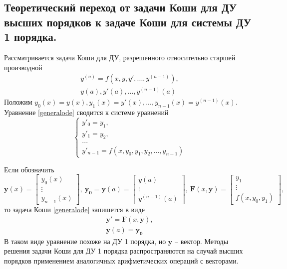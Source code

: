 \documentclass[a4paper, 12pt]{article}
\begin{document}
	\subsection{Теоретический переход от задачи Коши для ДУ высших порядков к задаче Коши для системы ДУ 1 порядка.}
	
	Рассматривается задача Коши для ДУ, разрешенного относительно старшей производной
	\begin{equation} \label{generalode}
		\begin{gathered}
			y^{(n)} = f(x,y,y',...,y^{(n-1)}),\\
			y(a), y'(a),...,y^{(n-1)}(a)
		\end{gathered}
	\end{equation}
	Положим $y_0(x) = y(x), y_1(x)=y'(x),...,y_{n-1}(x)=y^{(n-1)}(x)$. Уравнение \eqref{generalode} сводится к системе уравнений
	\begin{equation}
		\begin{cases}
			y'_0 = y_1,\\
			y'_1 = y_2,\\
			...\\
			y'_{n-1} = f(x,y_0,y_1,y_2,...,y_{n-1})
		\end{cases}
	\end{equation}

	Если обозначить 
		\begin{equation}
			\mathbf{y}(x)=
			\begin{bmatrix}
				y_0(x)\\
				\vdots\\
				y_{n-1}(x)
			\end{bmatrix}, \  
			\mathbf{y_0}=\mathbf{y}(a)=
			\begin{bmatrix}
				y(a)\\
				\vdots\\
				y^{(n-1)}(a)
			\end{bmatrix}, \ 
			\mathbf{F}(x,\mathbf{y}) = 
			\begin{bmatrix}
				y_1\\
				\vdots\\
				f(x,y_0,y_1)
			\end{bmatrix},
		\end{equation}
	то задача Коши \eqref{generalode} запишется в виде
	\begin{equation}
		\begin{gathered}
			\mathbf{y'}=\mathbf{F}(x,\mathbf{y}),\\
			\mathbf{y}(a)=\mathbf{y_0}
		\end{gathered}
	\end{equation}
	В таком виде уравнение похоже на ДУ 1 порядка, но $\mathbf{y}$ -- вектор. Методы решения задачи Коши для ДУ 1 порядка распространяются на случай высших порядков применением аналогичных арифметических операций с векторами.
	
\end{document}
